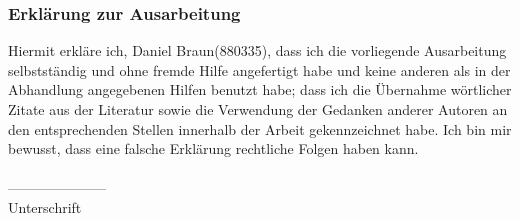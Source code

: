 \documentclass[fleqn,10pt,ngerman]{SelfArx}
\begin{document}
	\subsubsection*{Erklärung zur Ausarbeitung}
	Hiermit erkläre ich, Daniel Braun(880335), dass ich die vorliegende Ausarbeitung selbstständig und ohne fremde Hilfe angefertigt habe und keine anderen als in der Abhandlung angegebenen Hilfen benutzt habe; dass ich die Übernahme wörtlicher Zitate aus der Literatur sowie die Verwendung der Gedanken anderer Autoren an den entsprechenden Stellen innerhalb der Arbeit gekennzeichnet habe. Ich bin mir bewusst, dass eine falsche Erklärung rechtliche Folgen haben kann.\\ \\
	--------------------- \\
	Unterschrift
	
	
\end{document}
